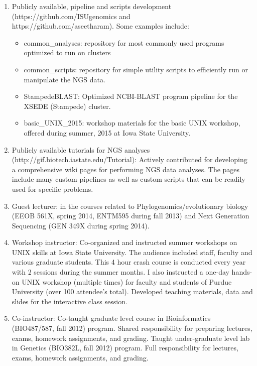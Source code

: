 \documentclass[svgnames,11pt]{article}
\begin{document}
\begin{enumerate}
\item Publicly available, pipeline and scripts development (https://github.com/ISUgenomics and \\
https://github.com/aseetharam). Some examples include:
\begin{itemize}
\item common\_analyses: repository for most commonly used programs optimized to run on clusters
\item common\_scripts: repository for simple utility scripts to efficiently run or manipulate the NGS data.
\item StampedeBLAST: Optimized NCBI-BLAST program pipeline for the XSEDE (Stampede) cluster.
\item basic\_UNIX\_2015: workshop materials for the basic UNIX workshop, offered during summer, 2015 at Iowa State University.
\end{itemize}
\item Publicly available tutorials for NGS analyses (http://gif.biotech.iastate.edu/Tutorial): Actively contributed for developing a comprehensive wiki pages for performing NGS data analyses. The pages include many custom pipelines as well as custom scripts that can be readily used for specific problems.

\item Guest lecturer: in the courses related to Phylogenomics/evolutionary biology (EEOB 561X, spring 2014, ENTM595 during fall 2013) and Next Generation Sequencing (GEN 349X during spring 2014). 

\item Workshop instructor: Co-organized and instructed summer workshops on UNIX skills at Iowa State University. The audience included staff, faculty and various graduate students. This 4 hour crash course is conducted every year with 2 sessions during the summer months. I also instructed a one-day hands-on UNIX workshop (multiple times) for faculty and students of Purdue University (over 100 attendee's total). Developed teaching materials, data and slides for the interactive class session.

\item Co-instructor: Co-taught graduate level course in Bioinformatics (BIO487/587, fall 2012) program. Shared responsibility for preparing lectures, exams, homework assignments, and grading. Taught under-graduate level lab in Genetics (BIO382L, fall 2012) program. Full responsibility for lectures, exams, homework assignments, and grading.
\end{enumerate}
\end{document}
